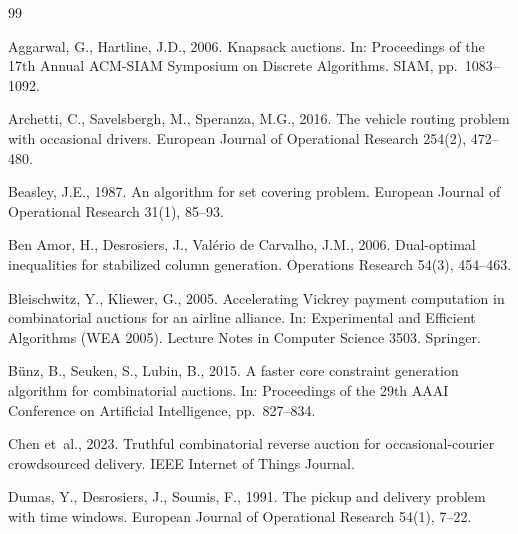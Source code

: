 \documentclass[review,12pt]{elsarticle}
\theoremstyle{definition}
\theoremstyle{remark}
\begin{document}
\begin{thebibliography}{99}

Aggarwal, G., Hartline, J.D., 2006. Knapsack auctions. In: Proceedings of
the 17th Annual ACM-SIAM Symposium on Discrete Algorithms. SIAM,
pp.~1083--1092. %

Archetti, C., Savelsbergh, M., Speranza, M.G., 2016. The vehicle routing
problem with occasional drivers. European Journal of Operational Research
254(2), 472--480.

Beasley, J.E., 1987. An algorithm for set covering problem. European Journal
of Operational Research 31(1), 85--93. %

Ben Amor, H., Desrosiers, J., Val{\'e}rio de Carvalho, J.M., 2006.
Dual-optimal inequalities for stabilized column generation. Operations
Research 54(3), 454--463.

Bleischwitz, Y., Kliewer, G., 2005. Accelerating Vickrey payment computation
in combinatorial auctions for an airline alliance. In: Experimental and
Efficient Algorithms (WEA 2005). Lecture Notes in Computer Science 3503.
Springer. %

B{\"u}nz, B., Seuken, S., Lubin, B., 2015. A faster core constraint
generation algorithm for combinatorial auctions. In: Proceedings of the
29th AAAI Conference on Artificial Intelligence, pp.~827--834.

Chen et~al., 2023. Truthful combinatorial reverse auction for
occasional-courier crowdsourced delivery. IEEE Internet of Things Journal.

Dumas, Y., Desrosiers, J., Soumis, F., 1991. The pickup and delivery problem
with time windows. European Journal of Operational Research 54(1), 7--22.


\end{thebibliography}
\end{document}
